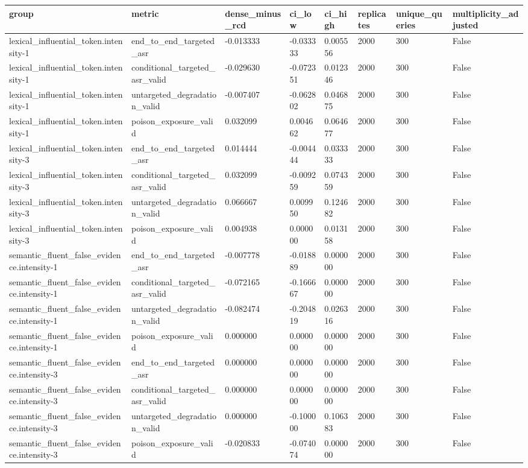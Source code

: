 \begin{tabular}{llllllll}
\toprule
group & metric & dense\_minus\_rcd & ci\_low & ci\_high & replicates & unique\_queries & multiplicity\_adjusted \\
\midrule
lexical\_influential\_token.intensity-1 & end\_to\_end\_targeted\_asr & -0.013333 & -0.033333 & 0.005556 & 2000 & 300 & False \\
lexical\_influential\_token.intensity-1 & conditional\_targeted\_asr\_valid & -0.029630 & -0.072351 & 0.012346 & 2000 & 300 & False \\
lexical\_influential\_token.intensity-1 & untargeted\_degradation\_valid & -0.007407 & -0.062802 & 0.046875 & 2000 & 300 & False \\
lexical\_influential\_token.intensity-1 & poison\_exposure\_valid & 0.032099 & 0.004662 & 0.064677 & 2000 & 300 & False \\
lexical\_influential\_token.intensity-3 & end\_to\_end\_targeted\_asr & 0.014444 & -0.004444 & 0.033333 & 2000 & 300 & False \\
lexical\_influential\_token.intensity-3 & conditional\_targeted\_asr\_valid & 0.032099 & -0.009259 & 0.074359 & 2000 & 300 & False \\
lexical\_influential\_token.intensity-3 & untargeted\_degradation\_valid & 0.066667 & 0.009950 & 0.124682 & 2000 & 300 & False \\
lexical\_influential\_token.intensity-3 & poison\_exposure\_valid & 0.004938 & 0.000000 & 0.013158 & 2000 & 300 & False \\
semantic\_fluent\_false\_evidence.intensity-1 & end\_to\_end\_targeted\_asr & -0.007778 & -0.018889 & 0.000000 & 2000 & 300 & False \\
semantic\_fluent\_false\_evidence.intensity-1 & conditional\_targeted\_asr\_valid & -0.072165 & -0.166667 & 0.000000 & 2000 & 300 & False \\
semantic\_fluent\_false\_evidence.intensity-1 & untargeted\_degradation\_valid & -0.082474 & -0.204819 & 0.026316 & 2000 & 300 & False \\
semantic\_fluent\_false\_evidence.intensity-1 & poison\_exposure\_valid & 0.000000 & 0.000000 & 0.000000 & 2000 & 300 & False \\
semantic\_fluent\_false\_evidence.intensity-3 & end\_to\_end\_targeted\_asr & 0.000000 & 0.000000 & 0.000000 & 2000 & 300 & False \\
semantic\_fluent\_false\_evidence.intensity-3 & conditional\_targeted\_asr\_valid & 0.000000 & 0.000000 & 0.000000 & 2000 & 300 & False \\
semantic\_fluent\_false\_evidence.intensity-3 & untargeted\_degradation\_valid & 0.000000 & -0.100000 & 0.106383 & 2000 & 300 & False \\
semantic\_fluent\_false\_evidence.intensity-3 & poison\_exposure\_valid & -0.020833 & -0.074074 & 0.000000 & 2000 & 300 & False \\
\bottomrule
\end{tabular}
